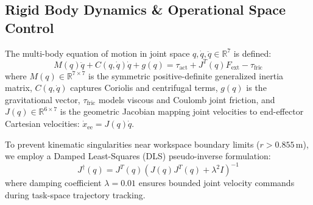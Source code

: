 \documentclass[10pt,twocolumn,a4paper]{article}
\newcommand{\R}{\mathbb{R}}
\begin{document}
\begin{table}[t]
\centering
\caption{Franka Emika Panda 7-DOF Kinematic \& Dynamic Parameters}
\label{tab:dh_parameters}
\end{table}

\subsection{Rigid Body Dynamics \& Operational Space Control}
The multi-body equation of motion in joint space $q, \dot{q}, \ddot{q} \in \R^7$ is defined:
\begin{equation}
  M(q)\ddot{q} + C(q, \dot{q})\dot{q} + g(q) = \tau_{\text{act}} + J^T(q) F_{\text{ext}} - \tau_{\text{fric}}
  \label{eq:dynamics}
\end{equation}
where $M(q) \in \R^{7 \times 7}$ is the symmetric positive-definite generalized inertia matrix, $C(q, \dot{q})$ captures Coriolis and centrifugal terms, $g(q)$ is the gravitational vector, $\tau_{\text{fric}}$ models viscous and Coulomb joint friction, and $J(q) \in \R^{6 \times 7}$ is the geometric Jacobian mapping joint velocities to end-effector Cartesian velocities: $\dot{x}_{\text{ee}} = J(q)\dot{q}$.

To prevent kinematic singularities near workspace boundary limits ($r > 0.855\,\text{m}$), we employ a Damped Least-Squares (DLS) pseudo-inverse formulation:
\begin{equation}
  J^\dagger(q) = J^T(q) \left( J(q)J^T(q) + \lambda^2 I \right)^{-1}
  \label{eq:dls_inverse}
\end{equation}
where damping coefficient $\lambda = 0.01$ ensures bounded joint velocity commands during task-space trajectory tracking.
\end{document}
